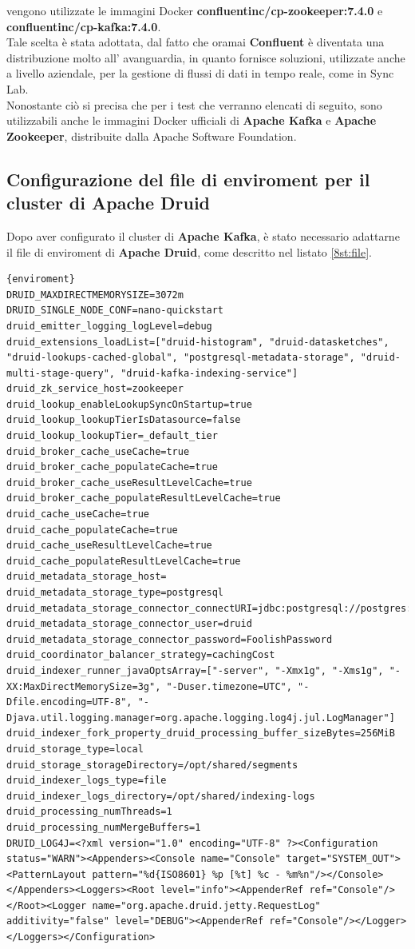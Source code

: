 vengono utilizzate le \gls{immagini Docker}{} \textbf{confluentinc/cp-zookeeper:7.4.0} e \\\textbf{confluentinc/cp-kafka:7.4.0}.\\
Tale scelta è stata adottata, dal fatto che oramai \textbf{Confluent} 
è diventata una distribuzione molto all' avanguardia, in quanto fornisce soluzioni, utilizzate anche a livello aziendale,
per la gestione di flussi di dati in tempo reale, come in Sync Lab.\\
Nonostante ciò si precisa che per i test che verranno elencati di seguito,
sono utilizzabili anche le \gls{immagini Docker}{} ufficiali di \textbf{Apache Kafka} e \textbf{Apache Zookeeper}, distribuite dalla 
\gls{Apache Software Foundation}.
\subsection{Configurazione del file di enviroment per il cluster di Apache Druid}
Dopo aver configurato il \gls{cluster}{} di \textbf{Apache Kafka}, è stato necessario adattarne il file di \gls{enviroment}{} di \textbf{Apache Druid}, come descritto nel listato \ref{8st:file}.
\begin{lstlisting}[caption=\texttt{enviroment}, label=8st:file]{enviroment}
DRUID_MAXDIRECTMEMORYSIZE=3072m
DRUID_SINGLE_NODE_CONF=nano-quickstart
druid_emitter_logging_logLevel=debug
druid_extensions_loadList=["druid-histogram", "druid-datasketches", "druid-lookups-cached-global", "postgresql-metadata-storage", "druid-multi-stage-query", "druid-kafka-indexing-service"]
druid_zk_service_host=zookeeper
druid_lookup_enableLookupSyncOnStartup=true
druid_lookup_lookupTierIsDatasource=false
druid_lookup_lookupTier=_default_tier
druid_broker_cache_useCache=true
druid_broker_cache_populateCache=true
druid_broker_cache_useResultLevelCache=true
druid_broker_cache_populateResultLevelCache=true
druid_cache_useCache=true
druid_cache_populateCache=true
druid_cache_useResultLevelCache=true
druid_cache_populateResultLevelCache=true
druid_metadata_storage_host=
druid_metadata_storage_type=postgresql
druid_metadata_storage_connector_connectURI=jdbc:postgresql://postgres:5432/druid
druid_metadata_storage_connector_user=druid
druid_metadata_storage_connector_password=FoolishPassword
druid_coordinator_balancer_strategy=cachingCost
druid_indexer_runner_javaOptsArray=["-server", "-Xmx1g", "-Xms1g", "-XX:MaxDirectMemorySize=3g", "-Duser.timezone=UTC", "-Dfile.encoding=UTF-8", "-Djava.util.logging.manager=org.apache.logging.log4j.jul.LogManager"]
druid_indexer_fork_property_druid_processing_buffer_sizeBytes=256MiB
druid_storage_type=local
druid_storage_storageDirectory=/opt/shared/segments
druid_indexer_logs_type=file
druid_indexer_logs_directory=/opt/shared/indexing-logs
druid_processing_numThreads=1
druid_processing_numMergeBuffers=1
DRUID_LOG4J=<?xml version="1.0" encoding="UTF-8" ?><Configuration status="WARN"><Appenders><Console name="Console" target="SYSTEM_OUT"><PatternLayout pattern="%d{ISO8601} %p [%t] %c - %m%n"/></Console></Appenders><Loggers><Root level="info"><AppenderRef ref="Console"/></Root><Logger name="org.apache.druid.jetty.RequestLog" additivity="false" level="DEBUG"><AppenderRef ref="Console"/></Logger></Loggers></Configuration>
\end{lstlisting}
